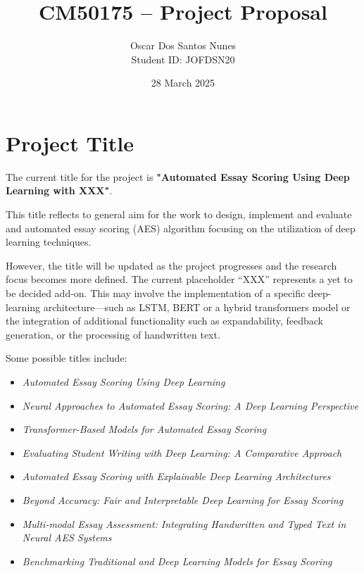 \documentclass[11pt]{article}
\title{CM50175 – Project Proposal}
\author{Oscar Dos Santos Nunes \\ Student ID: JOFDSN20}
\date{28 March 2025}
\begin{document}
\maketitle

\section*{Project Title}
The current title for the project is \textbf{"Automated Essay Scoring Using Deep Learning with XXX"}.

This title reflects to general aim for the work to design, implement and evaluate and automated essay scoring (AES) 
algorithm focusing on the utilization of deep learning techniques.

However, the title will be updated as the project progresses and the research focus becomes more defined. 
The current placeholder “XXX” represents a yet to be decided add-on. 
This may involve the implementation of a specific deep-learning architecture—such as LSTM, 
BERT or a hybrid transformers model or the integration of additional functionality such as expandability, 
feedback generation, or the processing of handwritten text.

\vspace{0.5em}

Some possible titles include:
\begin{itemize}
    \item \textit{Automated Essay Scoring Using Deep Learning}
    \item \textit{Neural Approaches to Automated Essay Scoring: A Deep Learning Perspective}
    \item \textit{Transformer-Based Models for Automated Essay Scoring}
    \item \textit{Evaluating Student Writing with Deep Learning: A Comparative Approach}
    \item \textit{Automated Essay Scoring with Explainable Deep Learning Architectures}
    \item \textit{Beyond Accuracy: Fair and Interpretable Deep Learning for Essay Scoring}
    \item \textit{Multi-modal Essay Assessment: Integrating Handwritten and Typed Text in Neural AES Systems}
    \item \textit{Benchmarking Traditional and Deep Learning Models for Essay Scoring}
\end{itemize}
\end{document}

